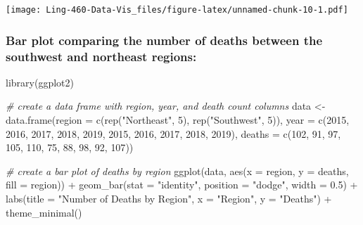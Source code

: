 \documentclass[
]{article}
\newenvironment{Shaded}{\begin{snugshade}}{\end{snugshade}}
\newcommand{\AttributeTok}[1]{\textcolor[rgb]{0.77,0.63,0.00}{#1}}
\newcommand{\CommentTok}[1]{\textcolor[rgb]{0.56,0.35,0.01}{\textit{#1}}}
\newcommand{\DecValTok}[1]{\textcolor[rgb]{0.00,0.00,0.81}{#1}}
\newcommand{\FloatTok}[1]{\textcolor[rgb]{0.00,0.00,0.81}{#1}}
\newcommand{\FunctionTok}[1]{\textcolor[rgb]{0.00,0.00,0.00}{#1}}
\newcommand{\NormalTok}[1]{#1}
\newcommand{\OtherTok}[1]{\textcolor[rgb]{0.56,0.35,0.01}{#1}}
\newcommand{\SpecialCharTok}[1]{\textcolor[rgb]{0.00,0.00,0.00}{#1}}
\newcommand{\StringTok}[1]{\textcolor[rgb]{0.31,0.60,0.02}{#1}}
\begin{document}
\texttt{[image: Ling-460-Data-Vis\_files/figure-latex/unnamed-chunk-10-1.pdf]}

\hypertarget{bar-plot-comparing-the-number-of-deaths-between-the-southwest-and-northeast-regions}{%
\subsubsection{Bar plot comparing the number of deaths between the
southwest and northeast
regions:}\label{bar-plot-comparing-the-number-of-deaths-between-the-southwest-and-northeast-regions}}

\begin{Shaded}
\begin{Highlighting}[]
\FunctionTok{library}\NormalTok{(ggplot2)}

\CommentTok{\# create a data frame with region, year, and death count columns}
\NormalTok{data }\OtherTok{\textless{}{-}} \FunctionTok{data.frame}\NormalTok{(}\AttributeTok{region =} \FunctionTok{c}\NormalTok{(}\FunctionTok{rep}\NormalTok{(}\StringTok{"Northeast"}\NormalTok{, }\DecValTok{5}\NormalTok{), }\FunctionTok{rep}\NormalTok{(}\StringTok{"Southwest"}\NormalTok{, }\DecValTok{5}\NormalTok{)),}
                   \AttributeTok{year =} \FunctionTok{c}\NormalTok{(}\DecValTok{2015}\NormalTok{, }\DecValTok{2016}\NormalTok{, }\DecValTok{2017}\NormalTok{, }\DecValTok{2018}\NormalTok{, }\DecValTok{2019}\NormalTok{, }\DecValTok{2015}\NormalTok{, }\DecValTok{2016}\NormalTok{, }\DecValTok{2017}\NormalTok{, }\DecValTok{2018}\NormalTok{, }\DecValTok{2019}\NormalTok{),}
                   \AttributeTok{deaths =} \FunctionTok{c}\NormalTok{(}\DecValTok{102}\NormalTok{, }\DecValTok{91}\NormalTok{, }\DecValTok{97}\NormalTok{, }\DecValTok{105}\NormalTok{, }\DecValTok{110}\NormalTok{, }\DecValTok{75}\NormalTok{, }\DecValTok{88}\NormalTok{, }\DecValTok{98}\NormalTok{, }\DecValTok{92}\NormalTok{, }\DecValTok{107}\NormalTok{))}

\CommentTok{\# create a bar plot of deaths by region}
\FunctionTok{ggplot}\NormalTok{(data, }\FunctionTok{aes}\NormalTok{(}\AttributeTok{x =}\NormalTok{ region, }\AttributeTok{y =}\NormalTok{ deaths, }\AttributeTok{fill =}\NormalTok{ region)) }\SpecialCharTok{+}
  \FunctionTok{geom\_bar}\NormalTok{(}\AttributeTok{stat =} \StringTok{"identity"}\NormalTok{, }\AttributeTok{position =} \StringTok{"dodge"}\NormalTok{, }\AttributeTok{width =} \FloatTok{0.5}\NormalTok{) }\SpecialCharTok{+}
  \FunctionTok{labs}\NormalTok{(}\AttributeTok{title =} \StringTok{"Number of Deaths by Region"}\NormalTok{,}
       \AttributeTok{x =} \StringTok{"Region"}\NormalTok{, }\AttributeTok{y =} \StringTok{"Deaths"}\NormalTok{) }\SpecialCharTok{+}
  \FunctionTok{theme\_minimal}\NormalTok{()}
\end{Highlighting}
\end{Shaded}
\end{document}

